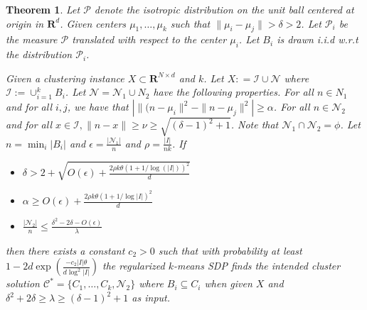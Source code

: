 \documentclass[12pt]{article}
\newcommand{\mc}{\mathcal}
\newcommand{\mb}{\mathbf}
\newtheorem{theorem}{Theorem}
\begin{document}
\begin{theorem}
\label{a-thm:regSDPIsometric}
Let $\mc P$ denote the isotropic distribution on the unit ball centered at origin in $\mb R^d$. Given centers $\mu_1, \ldots, \mu_k$ such that $\|\mu_i - \mu_j\| > \delta > 2$. Let $\mc P_i$ be the measure $\mc P$ translated with respect to the center $\mu_i$. Let $B_i$ is drawn i.i.d w.r.t the distribution $\mc P_i$. 

Given a clustering instance $X \subset \mb R^{N \times d}$ and $k$. Let $X : = \mc I \cup \mc N$ where $\mc I := \cup_{i=1}^k B_i$. Let $\mc N = \mc N_1 \cup N_2$ have the following properties. For all $n \in N_1$ and for all $i, j$, we have that $| \|(n-\mu_i\|^2 - \|n-\mu_j\|^2| \ge \alpha$. For all $n \in \mc N_2$ and for all $x \in \mc I, \|n- x\| \ge \nu \ge \sqrt{(\delta-1)^2+1}$. Note that $\mc N_1 \cap \mc N_2 = \phi$. Let $n = \min_i |B_i|$ and $\epsilon = \frac{|\mc N_1|}{n}$ and $\rho = \frac{|I|}{nk}$. If  

\begin{itemize}
  \item $\delta > 2 + \sqrt{ O(\epsilon) + \frac{2\rho k\theta(1+1/\log(|I|))^2}{d}}$ 
  \item $\alpha \ge O(\epsilon)+ \frac{2\rho k\theta(1+1/\log|I|)^2}{d}$ 
  \item $\frac{|\mc N_2|}{n} \le \frac{\delta^2-2\delta-O(\epsilon)}{\lambda}$
\end{itemize}
then there exists a constant $c_2 > 0$ such that with probability at least $1 - 2d\exp(\frac{-c_2|I|\theta}{d\log^2|I|})$ the regularized $k$-means SDP finds the intended cluster solution  $\mc C^* = \{C_1, \ldots, C_k, \mc N_2\}$ where $B_i \subseteq C_i$ when given $X$ and $\delta^2+2\delta \ge \lambda \ge (\delta-1)^2 + 1$ as input.
\end{theorem}
\end{document}
